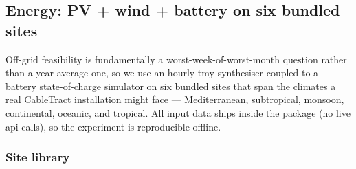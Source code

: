 \documentclass[11pt,a4paper]{article}
\begin{document}
\subsection{Energy: PV + wind + battery on six bundled sites}\label{sec:energy}

Off-grid feasibility is fundamentally a worst-week-of-worst-month question rather than a year-average one, so we use an hourly \gls{tmy} synthesiser coupled to a battery state-of-charge simulator on six bundled sites that span the climates a real CableTract installation might face --- Mediterranean, subtropical, monsoon, continental, oceanic, and tropical. All input data ships inside the package (no live \gls{api} calls), so the experiment is reproducible offline.

\subsubsection{Site library}\label{sec:sites}

\begin{table}[H]
\centering\small
\caption{Six bundled climate sites used by the energy simulator. Published GHI is from the source listed; the synthesiser reproduces it within 4\,\% on five sites and underestimates Ludhiana by 10\,\% (a known conservativeness of the Haurwitz envelope at low latitude).}\label{tab:sites}
\end{table}
\end{document}
